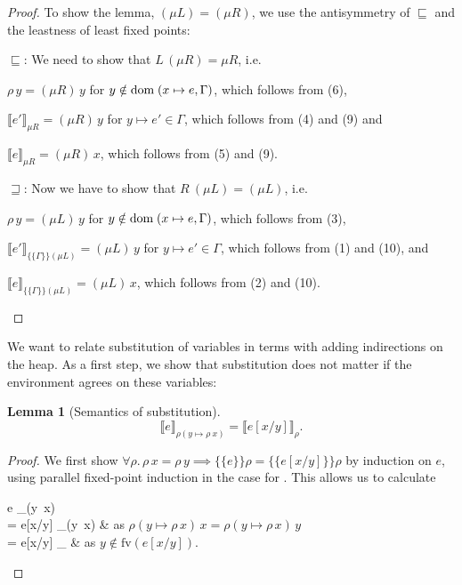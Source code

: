 \documentclass{jfp1}
\newtheorem{lemma}{Lemma}
\theoremstyle{nonumberbreak}
\newtheorem{proof}{Proof}
\newcommand{\keyword}[1]{\text{\textsf{#1}}}
\newcommand{\fv}[1]{\text{fv}(#1)}
\newcommand{\dsem}[2]{\llbracket #1 \rrbracket_{#2}}
\newcommand{\esem}[1]{\{\!\!\!\{#1\}\!\!\!\}}
\begin{document}
\begin{proof}
To show the lemma, $(\mu L) = (\mu R)$, we use the antisymmetry of $\sqsubseteq$ and the leastness of least fixed points:
\begin{compactitem}[$\sqsubseteq$:]
\item[$\sqsubseteq$:] We need to show that $L\, (\mu R) = \mu R$, i.e.
\begin{compactitem}
\item $\rho\,y = (\mu R)\, y$ for $y \notin \text{dom}\;(x\mapsto e,\Gamma)$, which follows from (6),
\item $\dsem{e'}{\mu R} = (\mu R)\, y$ for $y \mapsto e' \in \Gamma$, which follows from (4) and (9) and
\item $\dsem{e}{\mu R} = (\mu R)\, x$, which follows from (5) and (9).
\end{compactitem}
\item[$\sqsupseteq$:] Now we have to show that $R\ (\mu L) = (\mu L)$, i.e.
\begin{compactitem}
\item $\rho\,y = (\mu L)\, y$ for $y \notin \text{dom}\;(x\mapsto e,\Gamma)$, which follows from (3),
\item $\dsem{e'}{\esem{\Gamma}{(\mu L)}} = (\mu L)\, y$ for $y \mapsto e' \in \Gamma$, which follows from (1) and (10), and
\item $\dsem{e}{\esem{\Gamma}{(\mu L)}} = (\mu L)\, x$, which follows from (2) and (10).
\end{compactitem}
\end{compactitem}
\end{proof}

We want to relate substitution of variables in terms with adding indirections on the heap. As a first step, we show that substitution does not matter if the environment agrees on these variables:

\begin{lemma}[Semantics of substitution]
\[
\label{lem_subst}
\dsem{e}{\rho (y \mapsto \rho~x)} = \dsem{ e[x/y]}{\rho}.
\]
\end{lemma}

\begin{proof}

We first show $\forall\rho.\, \rho\,x = \rho\,y \implies \esem{e}\rho = \esem{e[x/y]}\rho$ by induction on $e$, using parallel fixed-point induction in the case for \keyword{let}. This allows us to calculate
\begin{conteq}
\dsem{e}{\rho (y \mapsto \rho\,x)} \\
= \dsem{e[x/y]}{\rho (y \mapsto \rho\,x)} & as $\rho (y \mapsto \rho\,x)\,x=\rho (y \mapsto \rho\,x)\,y$ \\
=  \dsem{e[x/y]}{\rho} & as $y\notin \fv{e[x/y]}$.
\end{conteq}
\end{proof}
\end{document}
